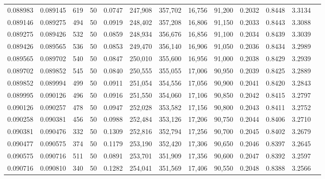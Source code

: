 \begin{tabular}{rrrrrrrrrrrrr}
0.088983 & 0.089145 &   619 &  50 &                                     0.0747 & 247,908 & 357,702 &  16,756 &  91,200 & 0.2032 & 0.8448 & 3.3134 \\
0.089146 & 0.089275 &   494 &  50 &                                     0.0919 & 248,402 & 357,208 &  16,806 &  91,150 & 0.2033 & 0.8443 & 3.3088 \\
0.089275 & 0.089426 &   532 &  50 &                                     0.0859 & 248,934 & 356,676 &  16,856 &  91,100 & 0.2034 & 0.8439 & 3.3039 \\
0.089426 & 0.089565 &   536 &  50 &                                     0.0853 & 249,470 & 356,140 &  16,906 &  91,050 & 0.2036 & 0.8434 & 3.2989 \\
0.089565 & 0.089702 &   540 &  50 &                                     0.0847 & 250,010 & 355,600 &  16,956 &  91,000 & 0.2038 & 0.8429 & 3.2939 \\
0.089702 & 0.089852 &   545 &  50 &                                     0.0840 & 250,555 & 355,055 &  17,006 &  90,950 & 0.2039 & 0.8425 & 3.2889 \\
0.089852 & 0.089994 &   499 &  50 &                                     0.0911 & 251,054 & 354,556 &  17,056 &  90,900 & 0.2041 & 0.8420 & 3.2843 \\
0.089995 & 0.090126 &   496 &  50 &                                     0.0916 & 251,550 & 354,060 &  17,106 &  90,850 & 0.2042 & 0.8415 & 3.2797 \\
0.090126 & 0.090257 &   478 &  50 &                                     0.0947 & 252,028 & 353,582 &  17,156 &  90,800 & 0.2043 & 0.8411 & 3.2752 \\
0.090258 & 0.090381 &   456 &  50 &                                     0.0988 & 252,484 & 353,126 &  17,206 &  90,750 & 0.2044 & 0.8406 & 3.2710 \\
0.090381 & 0.090476 &   332 &  50 &                                     0.1309 & 252,816 & 352,794 &  17,256 &  90,700 & 0.2045 & 0.8402 & 3.2679 \\
0.090477 & 0.090575 &   374 &  50 &                                     0.1179 & 253,190 & 352,420 &  17,306 &  90,650 & 0.2046 & 0.8397 & 3.2645 \\
0.090575 & 0.090716 &   511 &  50 &                                     0.0891 & 253,701 & 351,909 &  17,356 &  90,600 & 0.2047 & 0.8392 & 3.2597 \\
0.090716 & 0.090810 &   340 &  50 &                                     0.1282 & 254,041 & 351,569 &  17,406 &  90,550 & 0.2048 & 0.8388 & 3.2566 \\

\end{tabular}
